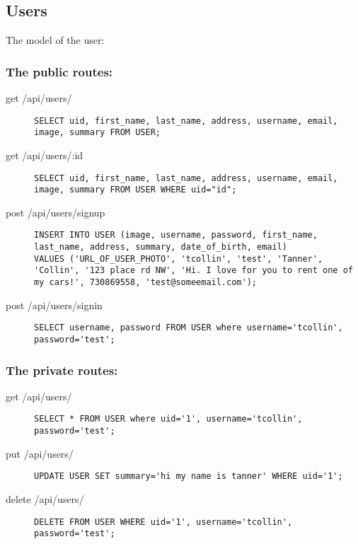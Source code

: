 \documentclass{article}
\begin{document}
\subsection{Users}
The model of the user:

\subsubsection{The public routes:}
\begin{description}
\item[get /api/users/] \mbox{}
\begin{lstlisting}
SELECT uid, first_name, last_name, address, username, email, image, summary FROM USER;
\end{lstlisting}


\item[get /api/users/:id] \mbox{}
\begin{lstlisting}
SELECT uid, first_name, last_name, address, username, email, image, summary FROM USER WHERE uid="id";
\end{lstlisting}

\item[post /api/users/signup] \mbox{}
\begin{lstlisting}
INSERT INTO USER (image, username, password, first_name, last_name, address, summary, date_of_birth, email)
VALUES ('URL_OF_USER_PHOTO', 'tcollin', 'test', 'Tanner', 'Collin', '123 place rd NW', 'Hi. I love for you to rent one of my cars!', 730869558, 'test@someemail.com');
\end{lstlisting}

\item[post /api/users/signin] \mbox{}
\begin{lstlisting}
SELECT username, password FROM USER where username='tcollin', password='test';
\end{lstlisting}
\end{description}

\subsubsection{The private routes:}
\begin{description}
\item[get /api/users/] \mbox{}
\begin{lstlisting}
SELECT * FROM USER where uid='1', username='tcollin', password='test';
\end{lstlisting}

\item[put /api/users/] \mbox{}
\begin{lstlisting}
UPDATE USER SET summary='hi my name is tanner' WHERE uid='1';
\end{lstlisting}

\item[delete /api/users/] \mbox{}
\begin{lstlisting}
DELETE FROM USER WHERE uid='1', username='tcollin', password='test';
\end{lstlisting}
\end{description}
\end{document}
